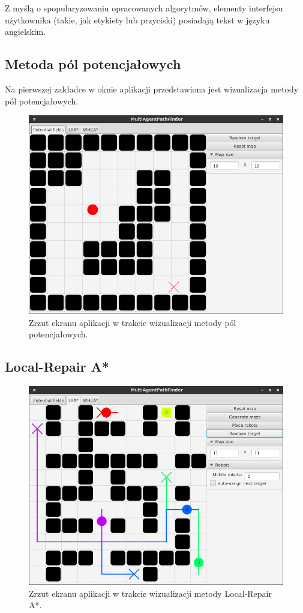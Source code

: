 Z myślą o spopularyzowaniu opracowanych algorytmów, elementy interfejsu użytkownika (takie, jak etykiety lub przyciski) posiadają tekst w języku angielskim.


\subsection{Metoda pól potencjałowych}
Na pierwszej zakładce w oknie aplikacji przedstawiona jest wizualizacja metody pól potencjałowych.

\begin{figure}
	\centering
	\includegraphics[width=0.8\columnwidth]{img/robopath/ui-fields}
	\caption{Zrzut ekranu aplikacji w trakcie wizualizacji metody pól potencjałowych.}
	\label{fig:robopath-ui-fields}
\end{figure}

\subsection{Local-Repair A*}

\begin{figure}
	\centering
	\includegraphics[width=0.8\columnwidth]{img/robopath/ui-lra}
	\caption{Zrzut ekranu aplikacji w trakcie wizualizacji metody Local-Repair A*.}
	\label{fig:robopath-ui-lra}
\end{figure}

